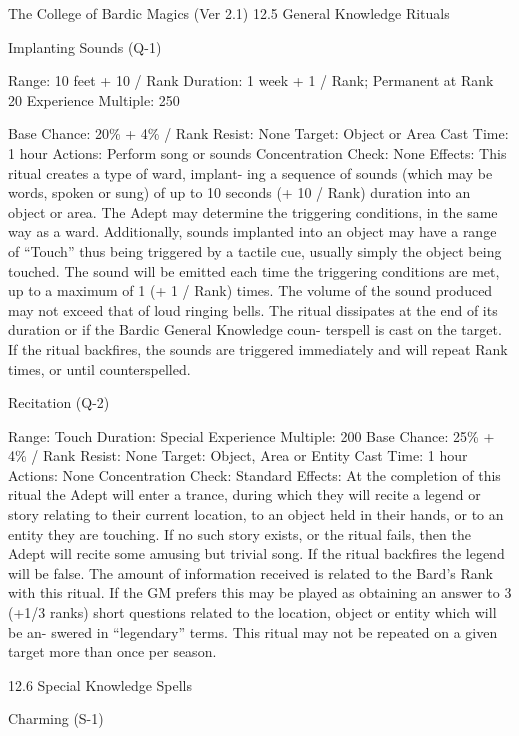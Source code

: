 \begin{Chapter}{The College of Bardic Magics (Ver 2.1)}
12.5 General Knowledge Rituals 

Implanting Sounds (Q-1) 

Range: 10 feet + 10 / Rank 
Duration:  1  week  +  1  /  Rank;  Permanent  at  Rank 
20 
Experience Multiple: 250 

Base Chance: 20\% + 4\% / Rank 
Resist: None 
Target: Object or Area 
Cast Time: 1 hour 
Actions: Perform song or sounds 
Concentration Check: None 
Effects: This ritual creates a type of ward, implant-
ing  a  sequence  of  sounds  (which  may  be  words, 
spoken or sung) of up to 10 seconds (+ 10 / Rank) 
duration  into  an  object  or  area.  The  Adept  may 
determine  the  triggering  conditions,  in  the  same 
way as a ward. Additionally, sounds implanted into 
an object may have a range of “Touch” thus being 
triggered by a tactile cue, usually simply the object 
being  touched.  The  sound  will  be  emitted  each 
time  the  triggering  conditions  are  met,  up  to  a 
maximum of 1 (+ 1 / Rank) times. The volume of 
the  sound  produced  may  not  exceed  that  of  loud 
ringing bells. The ritual dissipates at the end of its 
duration or if the Bardic General Knowledge coun-
terspell is cast on the target. If the ritual backfires, 
the  sounds  are  triggered  immediately  and  will 
repeat Rank times, or until counterspelled. 

Recitation (Q-2) 

Range: Touch 
Duration: Special 
Experience Multiple: 200 
Base Chance: 25\% + 4\% / Rank 
Resist: None 
Target: Object, Area or Entity 
Cast Time: 1 hour 
Actions: None 
Concentration Check: Standard 
Effects:  At  the  completion  of  this  ritual  the  Adept 
will enter a trance, during which they  will recite a 
legend or story relating to their current location, to 
an  object  held  in  their  hands,  or  to  an  entity  they 
are  touching.  If  no  such  story  exists,  or  the  ritual 
fails,  then  the  Adept  will  recite  some  amusing but 
trivial  song.  If  the  ritual  backfires  the  legend  will 
be  false.  The  amount  of  information  received  is 
related  to  the  Bard’s  Rank  with  this  ritual.  If  the 
GM  prefers  this  may  be  played  as  obtaining  an 
answer to 3 (+1/3 ranks) short questions related to 
the  location,  object  or  entity  which  will  be  an-
swered  in  “legendary”  terms.  This  ritual  may  not 
be  repeated  on  a  given  target  more  than  once  per 
season. 

12.6 Special Knowledge Spells 

Charming (S-1) 


\end{Chapter}
